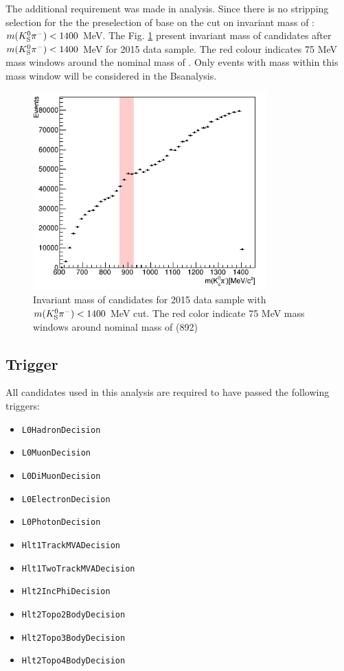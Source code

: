 The additional requirement was made in \Bs\to\Dss\Kstarm analysis. Since there is no stripping selection for the \Kstarm the preselection of \Kstar base on the cut on invariant mass of \KS\pim: $m({{K}^0_{\mathrm{S}}}{{\pi}^-})< 1400$ MeV.  The Fig. \ref{fig:kstar_stripp} present invariant mass of \KS\pim candidates after $m({{K}^0_{\mathrm{S}}}{{\pi}^-})< 1400$ MeV for 2015 data sample. The red colour indicates 75 MeV mass windows around the nominal mass of \Kstarm. Only events with \Kstarm mass within this mass window will be considered in the Bs\to\Dss\Kstarm analysis. 

\begin{figure}[h]
\includegraphics[width=9cm]{figs/introduction/Kstar_stripping.png}
\centering
\caption{Invariant mass of \KS\pim candidates for 2015 data sample with $m({{K}^0_{\mathrm{S}}}{{\pi}^-})< 1400$ MeV cut. The red color indicate 75 MeV mass windows around nominal mass of \Kstarm(892)}
\label{fig:kstar_stripp}
\end{figure}



\subsection{Trigger}

All  candidates used in this analysis are required to have passed the following triggers:

\begin{itemize}
    \item \texttt{L0HadronDecision}
    \item \texttt{L0MuonDecision}
    \item \texttt{L0DiMuonDecision}
    \item \texttt{L0ElectronDecision}
    \item \texttt{L0PhotonDecision}
    \item \texttt{Hlt1TrackMVADecision}
    \item \texttt{Hlt1TwoTrackMVADecision}
    \item \texttt{Hlt2IncPhiDecision}
    \item \texttt{Hlt2Topo2BodyDecision}
    \item \texttt{Hlt2Topo3BodyDecision}
    \item \texttt{Hlt2Topo4BodyDecision}
    
\end{itemize}

